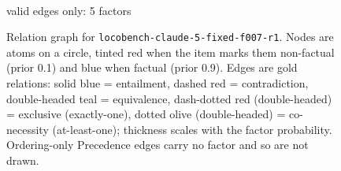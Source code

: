 \documentclass[11pt]{article}
\begin{document}
\begin{figure}[htbp]
\begin{minipage}[t]{0.48\linewidth}
{
}
\\[2pt]{\footnotesize valid edges only: 5 factors}
\end{minipage}
\caption{Relation graph for \texttt{locobench-claude-5-fixed-f007-r1}. Nodes are atoms on a circle, tinted red when the item marks them non-factual (prior 0.1) and blue when factual (prior 0.9). Edges are gold relations: solid blue = entailment, dashed red = contradiction, double-headed teal = equivalence, dash-dotted red (double-headed) = exclusive (exactly-one), dotted olive (double-headed) = co-necessity (at-least-one); thickness scales with the factor probability. Ordering-only Precedence edges carry no factor and so are not drawn.}
\label{fig:graph-locobench-claude-5-fixed-f007-r1}
\end{figure}
\end{document}
